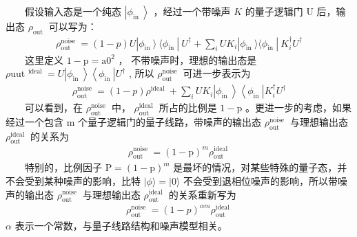 \documentclass[a4paper,11pt,english]{sphinxmanual}
\begin{document}
\sphinxAtStartPar
  假设输入态是一个纯态 \(\left|\phi_{\text {in }}\right\rangle\) ，经过一个带噪声 \({K}\) 的量子逻辑门 \(\mathrm{U}\) 后，输出态 \(\rho_{\text {out }}\) 可以写为：
\begin{equation*}
\begin{split}\rho_{\text {out }}^{\text {noise }}= (1-p) U |\phi_{\text {in }}\rangle\ \langle\phi_{\text {in }}| \ U^{\dagger}+\sum_{i} U K_{i}|\phi_{\text {in }}\rangle\langle\phi_{\text {in }}|\ K_{i}^{\dagger} U^{\dagger}\end{split}
\end{equation*}
\sphinxAtStartPar
  这里定义 \({1}-\mathrm{p}=\mathrm{a}{0}^{2}\)  ， 不带噪声时，理想的输出态是 \(\rho{\text {uut }}^{\text {ideal }}=U\left|\phi_{\text {in }}\right\rangle\left\langle\phi_{\text {in }}\right| U^{\dagger}\) , 所以 \(\rho_{\text {out }}^{\text {noise }}\) 可进一步表示为
\begin{equation*}
\begin{split}\rho_{\text {out }}^{\text {noise }}=(1-p) { \rho }^{\text {ideal }}+\sum_{i} U K_{i}\left|\phi_{\text {in }}\right\rangle\left\langle\phi_{\text {in }}\right| K_{i}^{\dagger} U^{\dagger}\end{split}
\end{equation*}
\sphinxAtStartPar
  可以看到，在 \(\rho_{\text {out }}^{\text {noise }}\) 中， \(\rho_{\text {out }}^{\text {ideal }}\) 所占的比例是 \(1-\mathrm{p}\) 。更进一步的考虑，如果经过一个包含 \(\mathrm{m}\) 个量子逻辑门的量子线路，带噪声的输出态 \(\rho_{\text {out }}^{\text {noise }}\) 与理想输出态 \(\rho_{\text {out }}^{\text {ideal }}\) 的关系为
\begin{equation*}
\begin{split}\rho_{\text {out }}^{\text {noise }}=(1-\mathrm{p})^{m} \rho_{\text {out }}^{\text {ideal }}\end{split}
\end{equation*}
\sphinxAtStartPar
  特别的，比例因子 \(\mathrm{P}=(1-\mathrm{p})^{m}\) 是最坏的情况，对某些特殊的量子态，并不会受到某种噪声的影响，比特 \(|\phi\rangle=|0\rangle\) 不会受到退相位噪声的影响，所以带噪声的输出态 \(\rho_{\text {out }}^{\text {noise }}\) 与理想输出态 \(\rho_{\text {out }}^{\text {ideal }}\) 的关系重新写为
\begin{equation*}
\begin{split}\rho_{\text {out }}^{\text {noise }}=(1-p)^{\alpha m} \rho_{\text {out }}^{\text {ideal }}\end{split}
\end{equation*}
\sphinxAtStartPar
\(\alpha\) 表示一个常数，与量子线路结构和噪声模型相关。
\end{document}
